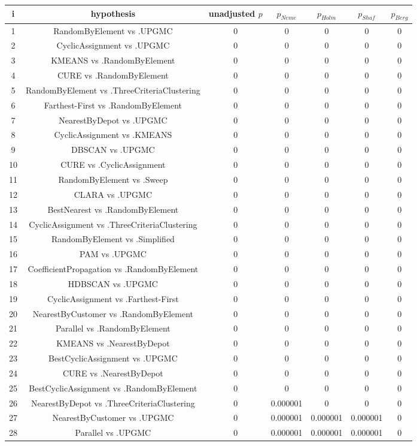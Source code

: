 \documentclass[a4paper,10pt]{article}
\begin{document}
\begin{landscape}
\begin{table}[!htp]
\centering\scriptsize
\begin{tabular}{ccccccc}
i&hypothesis&unadjusted $p$&$p_{Neme}$&$p_{Holm}$&$p_{Shaf}$&$p_{Berg}$\\
\hline1&RandomByElement vs .UPGMC&0&0&0&0&0\\
2&CyclicAssignment vs .UPGMC&0&0&0&0&0\\
3&KMEANS vs .RandomByElement&0&0&0&0&0\\
4&CURE vs .RandomByElement&0&0&0&0&0\\
5&RandomByElement vs .ThreeCriteriaClustering&0&0&0&0&0\\
6&Farthest-First vs .RandomByElement&0&0&0&0&0\\
7&NearestByDepot vs .UPGMC&0&0&0&0&0\\
8&CyclicAssignment vs .KMEANS&0&0&0&0&0\\
9&DBSCAN vs .UPGMC&0&0&0&0&0\\
10&CURE vs .CyclicAssignment&0&0&0&0&0\\
11&RandomByElement vs .Sweep&0&0&0&0&0\\
12&CLARA vs .UPGMC&0&0&0&0&0\\
13&BestNearest vs .RandomByElement&0&0&0&0&0\\
14&CyclicAssignment vs .ThreeCriteriaClustering&0&0&0&0&0\\
15&RandomByElement vs .Simplified&0&0&0&0&0\\
16&PAM vs .UPGMC&0&0&0&0&0\\
17&CoefficientPropagation vs .RandomByElement&0&0&0&0&0\\
18&HDBSCAN vs .UPGMC&0&0&0&0&0\\
19&CyclicAssignment vs .Farthest-First&0&0&0&0&0\\
20&NearestByCustomer vs .RandomByElement&0&0&0&0&0\\
21&Parallel vs .RandomByElement&0&0&0&0&0\\
22&KMEANS vs .NearestByDepot&0&0&0&0&0\\
23&BestCyclicAssignment vs .UPGMC&0&0&0&0&0\\
24&CURE vs .NearestByDepot&0&0&0&0&0\\
25&BestCyclicAssignment vs .RandomByElement&0&0&0&0&0\\
26&NearestByDepot vs .ThreeCriteriaClustering&0&0.000001&0&0&0\\
27&NearestByCustomer vs .UPGMC&0&0.000001&0.000001&0.000001&0\\
28&Parallel vs .UPGMC&0&0.000001&0.000001&0.000001&0\\

\end{tabular}
\end{table}
\end{landscape}
\end{document}
